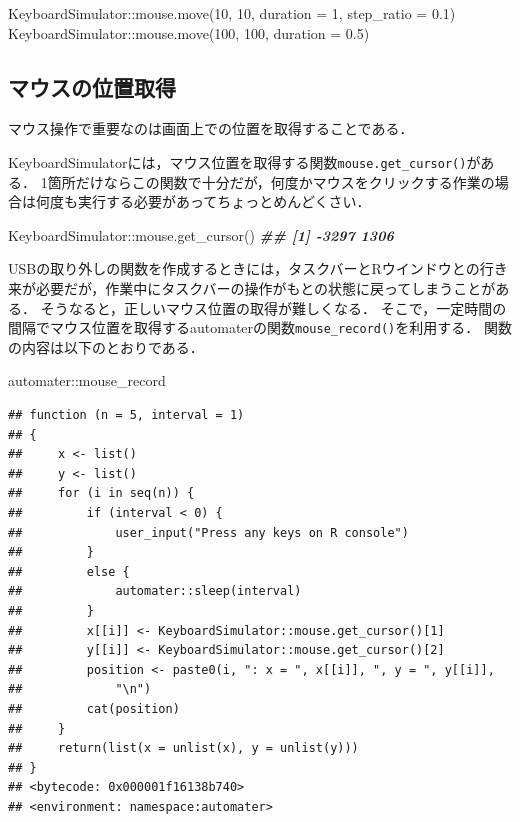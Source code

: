 \documentclass[
]{article}
\newenvironment{Shaded}{\begin{snugshade}}{\end{snugshade}}
\newcommand{\AttributeTok}[1]{\textcolor[rgb]{0.77,0.63,0.00}{#1}}
\newcommand{\DecValTok}[1]{\textcolor[rgb]{0.00,0.00,0.81}{#1}}
\newcommand{\DocumentationTok}[1]{\textcolor[rgb]{0.56,0.35,0.01}{\textbf{\textit{#1}}}}
\newcommand{\FloatTok}[1]{\textcolor[rgb]{0.00,0.00,0.81}{#1}}
\newcommand{\FunctionTok}[1]{\textcolor[rgb]{0.00,0.00,0.00}{#1}}
\newcommand{\NormalTok}[1]{#1}
\newcommand{\SpecialCharTok}[1]{\textcolor[rgb]{0.00,0.00,0.00}{#1}}
\begin{document}
\begin{Shaded}
\begin{Highlighting}[]
\NormalTok{KeyboardSimulator}\SpecialCharTok{::}\FunctionTok{mouse.move}\NormalTok{(}\DecValTok{10}\NormalTok{, }\DecValTok{10}\NormalTok{, }\AttributeTok{duration =} \DecValTok{1}\NormalTok{, }\AttributeTok{step\_ratio =} \FloatTok{0.1}\NormalTok{)}
\NormalTok{KeyboardSimulator}\SpecialCharTok{::}\FunctionTok{mouse.move}\NormalTok{(}\DecValTok{100}\NormalTok{, }\DecValTok{100}\NormalTok{, }\AttributeTok{duration =} \FloatTok{0.5}\NormalTok{)}
\end{Highlighting}
\end{Shaded}

\hypertarget{ux30deux30a6ux30b9ux306eux4f4dux7f6eux53d6ux5f97}{%
\subsection{マウスの位置取得}\label{ux30deux30a6ux30b9ux306eux4f4dux7f6eux53d6ux5f97}}

マウス操作で重要なのは画面上での位置を取得することである．

KeyboardSimulatorには，マウス位置を取得する関数\texttt{mouse.get\_cursor()}がある．
1箇所だけならこの関数で十分だが，何度かマウスをクリックする作業の場合は何度も実行する必要があってちょっとめんどくさい．

\begin{Shaded}
\begin{Highlighting}[]
\NormalTok{KeyboardSimulator}\SpecialCharTok{::}\FunctionTok{mouse.get\_cursor}\NormalTok{()}
 \DocumentationTok{\#\# [1] {-}3297  1306}
\end{Highlighting}
\end{Shaded}

USBの取り外しの関数を作成するときには，タスクバーとRウインドウとの行き来が必要だが，作業中にタスクバーの操作がもとの状態に戻ってしまうことがある．
そうなると，正しいマウス位置の取得が難しくなる．
そこで，一定時間の間隔でマウス位置を取得するautomaterの関数\texttt{mouse\_record()}を利用する．
関数の内容は以下のとおりである．

\begin{Shaded}
\begin{Highlighting}[]
\NormalTok{automater}\SpecialCharTok{::}\NormalTok{mouse\_record}
\end{Highlighting}
\end{Shaded}

\begin{verbatim}
## function (n = 5, interval = 1) 
## {
##     x <- list()
##     y <- list()
##     for (i in seq(n)) {
##         if (interval < 0) {
##             user_input("Press any keys on R console")
##         }
##         else {
##             automater::sleep(interval)
##         }
##         x[[i]] <- KeyboardSimulator::mouse.get_cursor()[1]
##         y[[i]] <- KeyboardSimulator::mouse.get_cursor()[2]
##         position <- paste0(i, ": x = ", x[[i]], ", y = ", y[[i]], 
##             "\n")
##         cat(position)
##     }
##     return(list(x = unlist(x), y = unlist(y)))
## }
## <bytecode: 0x000001f16138b740>
## <environment: namespace:automater>
\end{verbatim}
\end{document}
